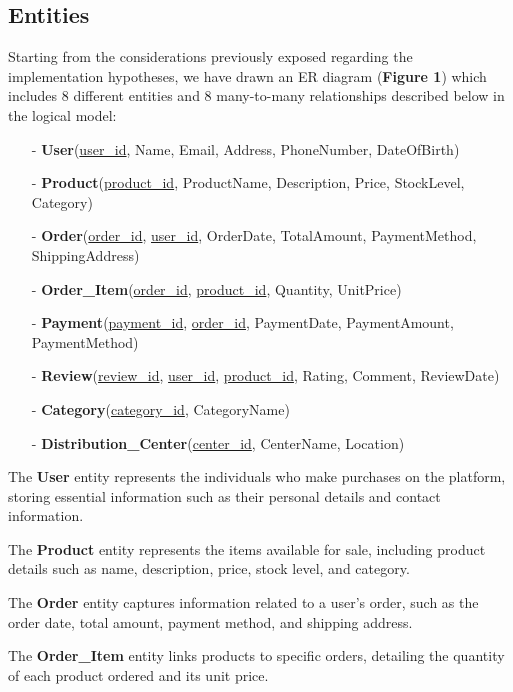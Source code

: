 \documentclass[a4paper,12pt]{article}
\begin{document}
  \subsection{Entities}
    \par Starting from the considerations previously exposed regarding the implementation hypotheses, we have drawn an ER diagram (\textbf{Figure 1}) which includes 8 different entities and 8 many-to-many relationships described below in the logical model: \par
    \begin{itemize}[noitemsep]
    \item[-]	\textbf{User}(\underline{user\_id}, Name, Email, Address, PhoneNumber, DateOfBirth)
    \item[-]	\textbf{Product}(\underline{product\_id}, ProductName, Description, Price, StockLevel, Category)
    \item[-]	\textbf{Order}(\underline{order\_id}, \underline{user\_id}, OrderDate, TotalAmount, PaymentMethod, ShippingAddress)
    \item[-]	\textbf{Order\_Item}(\underline{order\_id}, \underline{product\_id}, Quantity, UnitPrice)
    \item[-]	\textbf{Payment}(\underline{payment\_id}, \underline{order\_id}, PaymentDate, PaymentAmount, PaymentMethod)
    \item[-]	\textbf{Review}(\underline{review\_id}, \underline{user\_id}, \underline{product\_id}, Rating, Comment, ReviewDate)
    \item[-]	\textbf{Category}(\underline{category\_id}, CategoryName)
    \item[-]	\textbf{Distribution\_Center}(\underline{center\_id}, CenterName, Location)
    \end{itemize} \par

    The \textbf{User} entity represents the individuals who make purchases on the platform, storing essential information such as their personal details and contact information.

    The \textbf{Product} entity represents the items available for sale, including product details such as name, description, price, stock level, and category.

    The \textbf{Order} entity captures information related to a user’s order, such as the order date, total amount, payment method, and shipping address.

    The \textbf{Order\_Item} entity links products to specific orders, detailing the quantity of each product ordered and its unit price.
\end{document}

